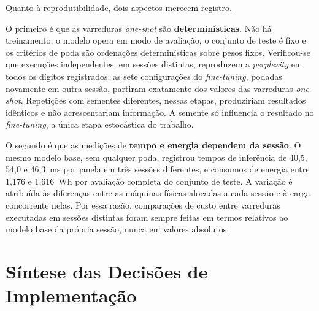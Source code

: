 Quanto à reprodutibilidade, dois aspectos merecem registro.

O primeiro é que as varreduras \textit{one-shot} são \textbf{determinísticas}. Não há
treinamento, o modelo opera em modo de avaliação, o conjunto de teste é fixo e os critérios
de poda são ordenações determinísticas sobre pesos fixos. Verificou-se que execuções
independentes, em sessões distintas, reproduzem a \textit{perplexity} em todos os dígitos
registrados: as sete configurações do \textit{fine-tuning}, podadas novamente em outra
sessão, partiram exatamente dos valores das varreduras \textit{one-shot}.
Repetições com sementes diferentes, nessas etapas,
produziriam resultados idênticos e não acrescentariam informação. A semente só influencia
o resultado no \textit{fine-tuning}, a única etapa estocástica do trabalho.

O segundo é que as medições de \textbf{tempo e energia dependem da sessão}. O mesmo modelo
base, sem qualquer poda, registrou tempos de inferência de 40,5, 54,0 e 46,3~ms por janela
em três sessões diferentes, e consumos de energia entre 1,176 e 1,616~Wh por avaliação
completa do conjunto de teste. A variação é atribuída às
diferenças entre as máquinas físicas alocadas a cada sessão e à carga concorrente nelas.
Por essa razão, comparações de custo entre varreduras executadas em sessões distintas
foram sempre feitas em termos relativos ao modelo base da própria sessão, nunca em valores
absolutos.

\section{Síntese das Decisões de Implementação}\label{sec:sintese_decisoes}


